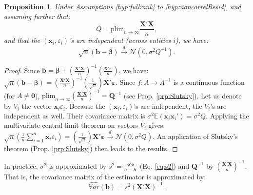 \documentclass[
  12pt,
]{book}
\newtheorem{proposition}{Proposition}[chapter]
\theoremstyle{definition}
\theoremstyle{definition}
\theoremstyle{definition}
\theoremstyle{definition}
\theoremstyle{remark}
\begin{document}
\begin{proposition}
\protect\hypertarget{prp:asymptOLS}{}\label{prp:asymptOLS}Under Assumptions \ref{hyp:fullrank} to \ref{hyp:noncorrelResid}, and assuming further that:
\begin{equation}
Q = \mbox{plim}_{n \rightarrow \infty} \frac{\mathbf{X}'\mathbf{X}}{n},\label{eq:Qasympt}
\end{equation}
and that the \((\mathbf{x}_i,\varepsilon_i)\)'s are independent (across entities \(i\)), we have:
\begin{equation}
\sqrt{n}(\mathbf{b} - \boldsymbol\beta)\overset{d} {\rightarrow} \mathcal{N}\left(0,\sigma^2Q^{-1}\right).\label{eq:convgceOLS}
\end{equation}
\end{proposition}

\begin{proof}
Since \(\mathbf{b} = \boldsymbol\beta + \left( \frac{\mathbf{X}'\mathbf{X}}{n}\right)^{-1}\left(\frac{\mathbf{X}'\boldsymbol\varepsilon}{n}\right)\), we have: \(\sqrt{n}(\mathbf{b} - \boldsymbol\beta) = \left( \frac{\mathbf{X}'\mathbf{X}}{n}\right)^{-1} \left(\frac{1}{\sqrt{n}}\right)\mathbf{X}'\boldsymbol\varepsilon\). Since \(f:A \rightarrow A^{-1}\) is a continuous function (for \(A \ne \mathbf{0}\)), \(\mbox{plim}_{n \rightarrow \infty} \left(\frac{\mathbf{X}'\mathbf{X}}{n}\right)^{-1} = \mathbf{Q}^{-1}\) (see Prop. \ref{prp:Slutsky}). Let us denote by \(V_i\) the vector \(\mathbf{x}_i \varepsilon_i\). Because the \((\mathbf{x}_i,\varepsilon_i)\)'s are independent, the \(V_i\)'s are independent as well. Their covariance matrix is \(\sigma^2\mathbb{E}(\mathbf{x}_i \mathbf{x}_i')=\sigma^2Q\). Applying the multivariate central limit theorem on vectors \(V_i\) gives \(\sqrt{n}\left(\frac{1}{n}\sum_{i=1}^n \mathbf{x}_i \varepsilon_i\right) = \left(\frac{1}{\sqrt{n}}\right)\mathbf{X}'\boldsymbol\varepsilon \overset{d}{\rightarrow} \mathcal{N}(0,\sigma^2Q)\). An application of Slutsky's theorem (Prop. \ref{prp:Slutsky}) then leads to the results.
\end{proof}

In practice, \(\sigma^2\) is approximated by \(s^2=\frac{\mathbf{e}'\mathbf{e}}{n-K}\) (Eq. \eqref{eq:s2}) and \(\mathbf{Q}^{-1}\) by \(\left(\frac{\mathbf{X}'\mathbf{X}}{n}\right)^{-1}\). That is, the covariance matrix of the estimator is approximated by:
\begin{equation}
\widehat{\mathbb{V}ar}(\mathbf{b}) = s^2 (\mathbf{X}'\mathbf{X})^{-1}.\label{eq:sXX}
\end{equation}
\end{document}
